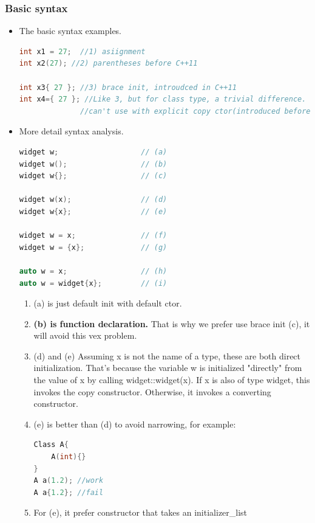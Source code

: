 \documentclass[a4paper,12pt,twoside]{book}
\begin{document}
\subsubsection{Basic syntax}
\begin{itemize}
	
	\item The basic syntax examples. 
\begin{lstlisting}[frame=single, language=c++,mathescape=true]
int x1 = 27;  //1) asiignment
int x2(27); //2) parentheses before C++11

int x3{ 27 }; //3) brace init, introudced in C++11
int x4={ 27 }; //Like 3, but for class type, a trivial difference. 
              //can't use with explicit copy ctor(introduced before)
\end{lstlisting}
	
	
\item More detail syntax analysis.
\begin{lstlisting}[frame=single, language=c++,mathescape=true]
widget w;                   // (a)
widget w();                 // (b)
widget w{};                 // (c)
	
widget w(x);                // (d)
widget w{x};                // (e)
	
widget w = x;               // (f)
widget w = {x};             // (g)
	
auto w = x;                 // (h)
auto w = widget{x};         // (i)
\end{lstlisting}
	
	\begin{enumerate}
		\item (a) is just default init with default ctor.
		\item \textbf{(b) is function declaration.} That is why we prefer use brace init (c), it will avoid this vex problem.
		
		\item (d) and (e) Assuming x is not the name of a type, these are both direct initialization. That's because the variable w is initialized "directly" from the value of x by calling widget::widget(x). If x is also of type widget, this invokes the copy constructor. Otherwise, it invokes a converting constructor.
		
		\item (e) is better than (d) to avoid narrowing, for example:
\begin{lstlisting}[frame=single, language=c++,mathescape=true]
Class A{
	A(int){}
}
A a(1.2); //work
A a{1.2}; //fail
\end{lstlisting}
		\item For (e), it prefer constructor that takes an initializer\_list
		

\end{enumerate}
\end{itemize}
\end{document}
